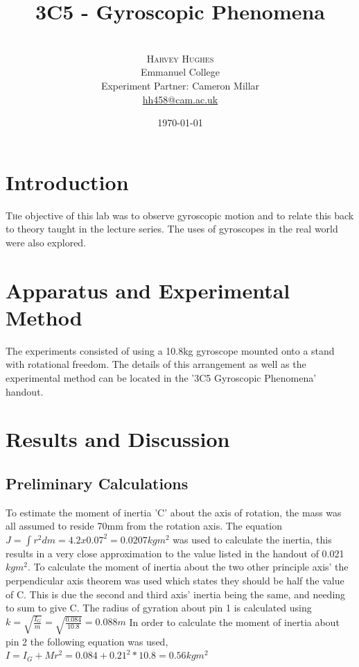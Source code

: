 \documentclass[twoside,twocolumn]{article}
\title{3C5 - Gyroscopic Phenomena} %
\author{%
\\
\textsc{Harvey Hughes} \\
\normalsize Emmanuel College \\ %
\normalsize Experiment Partner: Cameron Millar \\
\normalsize \href{mailto:hh458@cam.ac.uk}{hh458@cam.ac.uk} %
}
\date{\today} %
\begin{document}
\maketitle


\section{Introduction}

\lettrine[nindent=0em,lines=3]{T}he objective of this lab was to observe gyroscopic motion and to relate this back to theory taught in the lecture series. The uses of gyroscopes in the real world were also explored. 
\newline

\section{Apparatus and Experimental Method}
The experiments consisted of using a 10.8kg gyroscope mounted onto a stand with rotational freedom. The details of this arrangement as well as the experimental method can be located in the '3C5 Gyroscopic Phenomena' handout. 

\section{Results and Discussion}
\subsection{Preliminary Calculations}
To estimate the moment of inertia 'C' about the axis of rotation, the mass was all assumed to reside 70mm from the rotation axis. The equation $J = \int r^{2}dm = 4.2x0.07^{2} = 0.0207kgm^2$ was used to calculate the inertia, this results in a very close approximation to the value listed in the handout of 0.021$kgm^2$.
To calculate the moment of inertia about the two other principle axis' the perpendicular axis theorem was used which states they should be half the value of C. This is due the second and third axis' inertia being the same, and needing to sum to give C.
\newline
The radius of gyration about pin 1 is calculated using $k=\sqrt{\frac{I_G}{m}}=\sqrt{\frac{0.084}{10.8}}=0.088m$
\newline
In order to calculate the moment of inertia about pin 2 the following equation was used, $I=I_G +Mr^2 = 0.084+0.21^2*10.8 = 0.56kgm^2$
\end{document}
